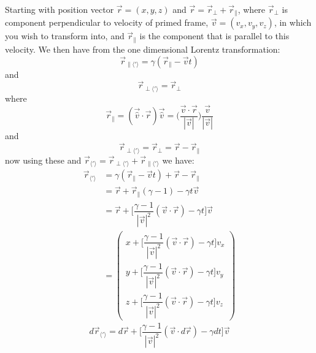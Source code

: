 Starting with position vector $\vec{r} = (x,y,z)$ and $\vec{r} = \vec{r}_{\perp} + \vec{r}_{\parallel}$, where $\vec{r}_{\perp}$ is component perpendicular to velocity of primed frame, $\vec{v}= (v_x,v_y,v_z)$, in which you wish to transform into, and $\vec{r}_{\parallel}$ is the component that is parallel to this velocity. We then have from the one dimensional Lorentz transformation:
\begin{equation}%
    \vec{r}_{\parallel \langle ' \rangle}  = \gamma (\vec{r}_{\parallel}-\vec{v}t)
\end{equation}%
and
\begin{equation}%
    \vec{r}_{\perp \langle ' \rangle}  = \vec{r}_{\perp}
\end{equation}%
where
\begin{equation}%
    \vec{r}_{\parallel}= \left( \vec{\hat{v}}\cdot\vec{r}\right)\vec{\hat{v}} =  \bigg(\dfrac{\vec{v}\cdot\vec{r}}{|\vec{v}|}\bigg)\dfrac{\vec{v}}{|\vec{v}|}
\end{equation}%
and
\begin{equation}%
    \vec{r}_{\perp \langle ' \rangle} = \vec{r}_{\perp}= \vec{r} - \vec{r}_{\parallel}
\end{equation}%
now using these and $\vec{r}_{\langle ' \rangle}  = \vec{r}_{\perp \langle ' \rangle}  + \vec{r}_{\parallel \langle ' \rangle} $ we have:
\begin{equation}%
    \begin{aligned}
    \vec{r}_{\langle ' \rangle}  &= \gamma (\vec{r}_{\parallel}-\vec{v}t) + \vec{r} - \vec{r}_{\parallel} \\
    &= \vec{r} + \vec{r}_{\parallel}(\gamma-1) - \gamma t \vec{v} \\
    &= \vec{r} + \Big[ \dfrac{\gamma-1}{|\vec{v}|^2}(\vec{v}\cdot\vec{r})- \gamma t\Big]\vec{v}\\
    &= \begin{pmatrix}
    x + \Big[ \dfrac{\gamma-1}{|\vec{v}|^2}(\vec{v}\cdot\vec{r})- \gamma t\Big] v_x\\
    y + \Big[ \dfrac{\gamma-1}{|\vec{v}|^2}(\vec{v}\cdot\vec{r})- \gamma t\Big] v_y\\
    z + \Big[ \dfrac{\gamma-1}{|\vec{v}|^2}(\vec{v}\cdot\vec{r})- \gamma t\Big] v_z
    \end{pmatrix}
    \end{aligned}
\end{equation}%
\begin{equation}%
    d\vec{r}_{\langle ' \rangle}  = d\vec{r} + \Big[ \dfrac{\gamma-1}{|\vec{v}|^2}(\vec{v}\cdot d\vec{r})- \gamma dt\Big]\vec{v}
\end{equation}%
